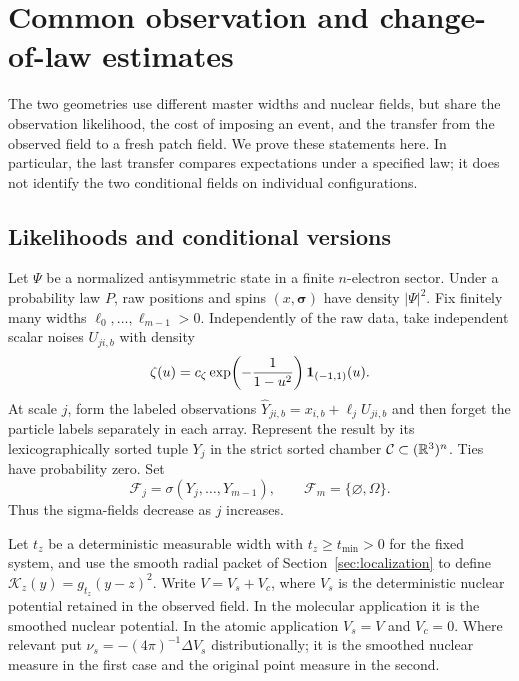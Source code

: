 \section{Common observation and change-of-law estimates}\label{sec:observations}

The two geometries use different master widths and nuclear fields, but
share the observation likelihood, the cost of imposing an event, and
the transfer from the observed field to a fresh patch field. We prove
these statements here. In particular, the last transfer compares
expectations under a specified law; it does not identify the two
conditional fields on individual configurations.

\subsection{Likelihoods and conditional versions}

Let $\Psi$ be a normalized antisymmetric state in a finite $n$-electron
sector. Under a probability law $P$, raw positions and spins
$(x,\boldsymbol\sigma)$ have density $|\Psi|^2$. Fix finitely many
widths $\ell_0,\ldots,\ell_{m-1}>0$. Independently of the raw data,
take independent scalar noises $U_{ji,b}$ with density
\[
 \zeta(u)=c_\zeta\exp\!\left(-\frac1{1-u^2}\right)
                         \mathbf 1_{(-1,1)}(u).
\]
At scale $j$, form the labeled observations
$\widehat Y_{ji,b}=x_{i,b}+\ell_jU_{ji,b}$ and then forget the
particle labels separately in each array. Represent the result by
its lexicographically sorted tuple $Y_j$ in the strict sorted chamber
$\mathcal C\subset(\mathbb R^3)^n$. Ties have probability zero. Set
\[
 \mathcal F_j=\sigma(Y_j,\ldots,Y_{m-1}),\qquad
 \mathcal F_m=\{\varnothing,\Omega\}.
\]
Thus the sigma-fields decrease as $j$ increases.

Let $t_z$ be a deterministic measurable width with
$t_z\ge t_{\min}>0$ for the fixed system, and use the smooth radial
packet of Section~\ref{sec:localization} to define
$\mathcal K_z(y)=g_{t_z}(y-z)^2$. Write
$V=V_s+V_c$, where $V_s$ is the deterministic nuclear potential
retained in the observed field. In the molecular application it is
the smoothed nuclear potential. In the atomic application
$V_s=V$ and $V_c=0$. Where relevant put
$\nu_s=-(4\pi)^{-1}\Delta V_s$ distributionally; it is the
smoothed nuclear measure in the first case and the original
point measure in the second.

